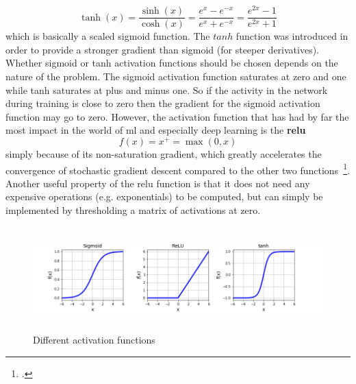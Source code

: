 \begin{equation}
	\tanh(x) = \frac{\sinh(x)}{\cosh(x)} = \frac{e^{x}-e^{-x}}{e^{x}+e^{-x}} = \frac{e^{2x}-1}{e^{2x}+1}
\end{equation}
which is basically a scaled sigmoid function. The $ tanh $ function was introduced in order to provide a stronger gradient than sigmoid (for steeper derivatives). Whether sigmoid or tanh activation functions should be chosen depends on the nature of the problem. The sigmoid activation function saturates at zero and one while tanh saturates at plus and minus one. So if the activity in the network during training is close to zero then the gradient for the sigmoid activation function may go to zero. However, the activation function that has had by far the most impact in the world of \gls{ml} and especially deep learning is the \textbf{\gls{relu}}
\begin{equation}
	f(x) = x^{+} = \max(0,x)
\end{equation}
simply because of its non-saturation gradient, which greatly accelerates the convergence of stochastic gradient descent compared to the other two functions~\footcite{10.1145/3065386}. Another useful property of the \gls{relu} function is that it does not need any expensive operations (e.g. exponentials) to be computed, but can simply be implemented by thresholding a matrix of activations at zero.
\begin{figure}
	\includegraphics[height=4cm]{img/activation_functions}
	\caption{Different activation functions}
	\label{fig:different_activation_functions}
\end{figure}

